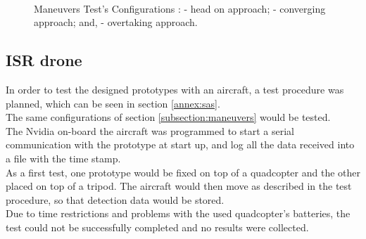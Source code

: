 \begin{figure}[!htb]
  \centering
  \hspace{3pt}
  \hspace{3pt}
  \\
  \caption[Maneuvers Test's Configurations \citep{Planefinder2012}]{Maneuvers Test's Configurations \citep{Planefinder2012}:
			 - head on approach;
			 - converging approach; and,
			 - overtaking approach.}%
  \label{fig:configurations}
\end{figure}

\subsection{ISR drone}
\label{subsection:IRisrdrone}

In order to test the designed prototypes with an aircraft, a test procedure was planned, which can be seen in section \ref{annex:sas}.\\
The same configurations of section \ref{subsection:maneuvers} would be tested.\\ 

The Nvidia on-board the aircraft was programmed to start a serial communication with the prototype at start up, and log all the data received into a file with the time stamp.\\
As a first test, one prototype would be fixed on top of a quadcopter and the other placed on top of a tripod. The aircraft would then move as described in the test procedure, so that detection data would be stored.\\
Due to time restrictions and problems with the used quadcopter's batteries, the test could not be successfully completed and no results were collected.\\
